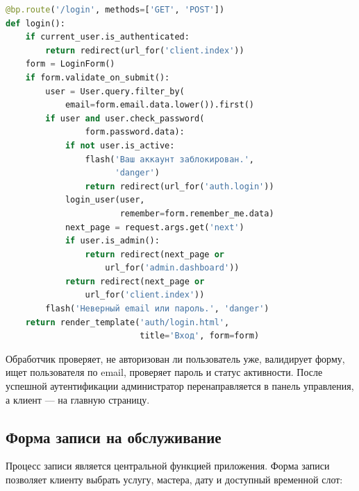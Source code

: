 \documentclass[14pt,a4paper,oneside]{extarticle}
\begin{document}
\begin{lstlisting}[language=Python, caption={Обработчик входа в систему (auth/routes.py)}, label={lst:login}]
@bp.route('/login', methods=['GET', 'POST'])
def login():
    if current_user.is_authenticated:
        return redirect(url_for('client.index'))
    form = LoginForm()
    if form.validate_on_submit():
        user = User.query.filter_by(
            email=form.email.data.lower()).first()
        if user and user.check_password(
                form.password.data):
            if not user.is_active:
                flash('Ваш аккаунт заблокирован.',
                      'danger')
                return redirect(url_for('auth.login'))
            login_user(user,
                       remember=form.remember_me.data)
            next_page = request.args.get('next')
            if user.is_admin():
                return redirect(next_page or
                    url_for('admin.dashboard'))
            return redirect(next_page or
                url_for('client.index'))
        flash('Неверный email или пароль.', 'danger')
    return render_template('auth/login.html',
                           title='Вход', form=form)
\end{lstlisting}

Обработчик проверяет, не авторизован ли пользователь уже, валидирует форму, ищет пользователя по email, проверяет пароль и статус активности. После успешной аутентификации администратор перенаправляется в панель управления, а клиент --- на главную страницу.

\subsection{Форма записи на обслуживание}

Процесс записи является центральной функцией приложения. Форма записи позволяет клиенту выбрать услугу, мастера, дату и доступный временной слот:
\end{document}

